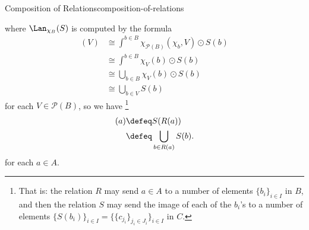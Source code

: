 \begin{definition}{Composition of Relations}{composition-of-relations}
\begin{enumerate}
\begin{webcompile}
%
            \end{webcompile}
            where $\Lan_{\chi_{B}}(S)$ is computed by the formula
            \begin{align*}
                [\Lan_{\chi_{B}}(S)](V) &\cong \int^{b\in B}\chi_{\mathcal{P}(B)}(\chi_{b},V)\odot S(b)\\
                                        &\cong \int^{b\in B}\chi_{V}(b)\odot S(b)\\
                                        &\cong \bigcup_{b\in B}\chi_{V}(b)\odot S(b)\\
                                        &\cong \bigcup_{b\in V}S(b)
            \end{align*}
            for each $V\in\mathcal{P}(B)$, so we have%
            \footnote{%
                That is: the relation $R$ may send $a\in A$ to a number of elements $\{b_{i}\}_{i\in I}$ in $B$, and then the relation $S$ may send the image of each of the $b_{i}$'s to a number of elements $\{S(b_{i})\}_{i\in I}=\{\{c_{j_{i}}\}_{j_{i}\in J_{i}}\}_{i\in I}$ in $C$.
                \par\vspace*{\TCBBoxCorrection}
            }%
            \begin{align*}
                [S\procirc R](a) &\defeq S(R(a))\\
                                 &\defeq \bigcup_{b\in R(a)}S(b).
            \end{align*}
            for each $a\in A$.
    \end{enumerate}
\end{definition}
